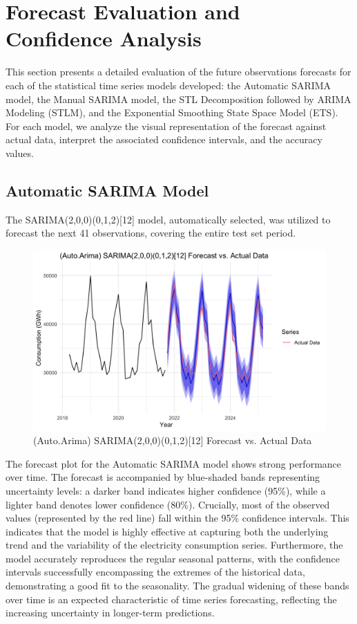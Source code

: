 \section{Forecast Evaluation and Confidence Analysis}

This section presents a detailed evaluation of the future observations forecasts for each of the statistical time series models developed: the Automatic SARIMA model, the Manual SARIMA model, the STL Decomposition followed by ARIMA Modeling (STLM), and the Exponential Smoothing State Space Model (ETS). For each model, we analyze the visual representation of the forecast against actual data, interpret the associated confidence intervals, and the accuracy values.

\subsection{Automatic SARIMA Model}

The SARIMA(2,0,0)(0,1,2)[12] model, automatically selected, was utilized to forecast the next 41 observations, covering the entire test set period. \\

\begin{figure}[H]
    \centering
    \includegraphics[width=1\linewidth]{images/for_auto.png}
    \caption{(Auto.Arima) SARIMA(2,0,0)(0,1,2)[12] Forecast vs. Actual Data}
    \label{fig:enter-label}
\end{figure}

The forecast plot for the Automatic SARIMA model shows strong performance over time. The forecast is accompanied by blue-shaded bands representing uncertainty levels: a darker band indicates higher confidence (95\%), while a lighter band denotes lower confidence (80\%). Crucially, most of the observed values (represented by the red line) fall within the 95\% confidence intervals. This indicates that the model is highly effective at capturing both the underlying trend and the variability of the electricity consumption series. Furthermore, the model accurately reproduces the regular seasonal patterns, with the confidence intervals successfully encompassing the extremes of the historical data, demonstrating a good fit to the seasonality. The gradual widening of these bands over time is an expected characteristic of time series forecasting, reflecting the increasing uncertainty in longer-term predictions.\\

